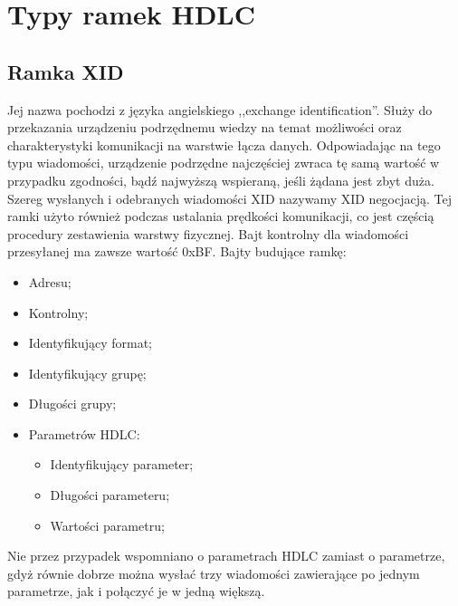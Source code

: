 \section{Typy ramek HDLC}
	\subsection{Ramka XID}
	Jej nazwa pochodzi z języka angielskiego ,,exchange identification''. 
	Służy do przekazania urządzeniu podrzędnemu wiedzy na temat możliwości oraz charakterystyki komunikacji na warstwie łącza danych.\autocite{WIKI_ENG_HDLC}
	Odpowiadając na tego typu wiadomości, urządzenie podrzędne najczęściej zwraca tę samą wartość w przypadku zgodności, 
	bądź najwyższą wspieraną, jeśli żądana jest zbyt duża. Szereg wysłanych i odebranych wiadomości XID nazywamy XID negocjacją.
	Tej ramki użyto również podczas ustalania prędkości komunikacji, co jest częścią procedury zestawienia warstwy fizycznej.
	Bajt kontrolny dla wiadomości przesyłanej ma zawsze wartość 0xBF. \newline
	Bajty budujące ramkę:
	\begin{itemize}
		\item Adresu;
		\item Kontrolny;
		\item Identyfikujący format;
		\item Identyfikujący grupę;
		\item Długości grupy;
		\item Parametrów HDLC:
		\begin{itemize}
			\item Identyfikujący parameter;
			\item Długości parameteru;
			\item Wartości parametru;
		\end{itemize}
	\end{itemize} 
	Nie przez przypadek wspomniano o parametrach HDLC zamiast o parametrze, gdyż równie dobrze można wysłać
    trzy wiadomości zawierające po jednym parametrze, jak i połączyć je w jedną większą.
	